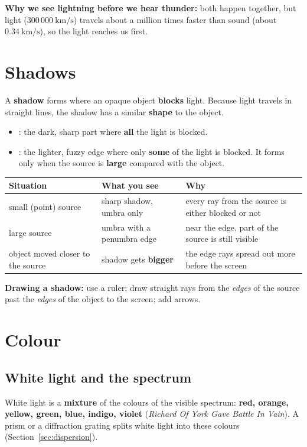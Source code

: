 \documentclass[11pt]{article}
\begin{document}
\textbf{Why we see lightning before we hear thunder:} both happen together, but light ($300\,000\ \mathrm{km/s}$) travels about a million times faster than sound (about $0.34\ \mathrm{km/s}$), so the light reaches us first.

\section{Shadows}\label{sec:shadows}
A \textbf{shadow} forms where an opaque object \textbf{blocks} light. Because light travels in straight lines, the shadow has a similar \textbf{shape} to the object.
\begin{center}\hspace{8mm}\end{center}
\begin{itemize}
\item \textbf{\tUmbra}: the dark, sharp part where \textbf{all} the light is blocked.
\item \textbf{\tPenumbra}: the lighter, fuzzy edge where only \textbf{some} of the light is blocked. It forms only when the source is \textbf{large} compared with the object.
\end{itemize}
\begin{tabularx}{\textwidth}{@{}X X X@{}}
\toprule
\textbf{Situation} & \textbf{What you see} & \textbf{Why}\\
\midrule
small (point) source & sharp shadow, umbra only & every ray from the source is either blocked or not\\
large source & umbra with a penumbra edge & near the edge, part of the source is still visible\\
object moved closer to the source & shadow gets \textbf{bigger} & the edge rays spread out more before the screen\\
\bottomrule
\end{tabularx}
\textbf{Drawing a shadow:} use a ruler; draw straight rays from the \emph{edges} of the source past the \emph{edges} of the object to the screen; add arrows.

\section{Colour}\label{sec:colour}
\subsection*{White light and the spectrum}
White light is a \textbf{mixture} of the colours of the visible spectrum:
\textbf{red, orange, yellow, green, blue, indigo, violet} (\emph{Richard Of York Gave Battle In Vain}). A prism or a diffraction grating splits white light into these colours (Section~\ref{sec:dispersion}).
\end{document}
